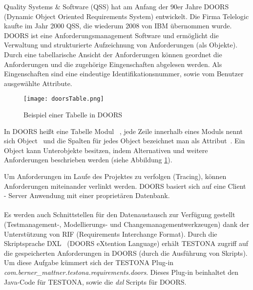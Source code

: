 
Quality Systems \& Software (QSS) hat am Anfang der 90er Jahre DOORS (Dynamic Object Oriented Requirements System) entwickelt. Die Firma Telelogic kaufte im Jahr 2000 QSS, die wiederum 2008 von IBM übernommen wurde. DOORS ist eine Anforderungsmanagement Software und ermöglicht die Verwaltung und strukturierte Aufzeichnung von Anforderungen (als Objekte). Durch eine tabellarische Ansicht der Anforderungen können geordnet die Anforderungen und die zugehörige Eingenschaften abgelesen werden. Als Eingenschaften sind eine eindeutige Identifikationsnummer, sowie vom Benutzer ausgewählte Attribute.\\


\begin{figure}[h]
  \begin{center}
    \texttt{[image: doorsTable.png]}
  		  \caption{Beispiel einer Tabelle in DOORS}
     \label{doors.bespiel}
  \end{center}
\end{figure}


In DOORS heißt eine Tabelle \glqq Modul\grqq~ , jede Zeile innerhalb eines Moduls nennt sich \glqq Object\grqq~ und die Spalten für jedes Object bezeichnet man als \glqq Attribut\grqq~. Ein Object kann Unterobjekte besitzen, indem Alternativen und weitere Anforderungen beschrieben werden (siehe Abbildung \ref{doors.bespiel}).

Um Anforderungen im Laufe des Projektes zu verfolgen (Tracing), können Anforderungen miteinander verlinkt werden. DOORS basiert sich auf eine Client - Server Anwendung mit einer proprietären Datenbank. \\
\\
Es werden auch Schnittstellen für den Datenaustausch zur Verfügung gestellt (Testmanagement-, Modellierungs- und Changemanagementwerkzeugen) dank der Unterstützung von RIF (Requirements Interchange Format). Durch die Skriptsprache \glqq DXL\grqq~ (DOORS eXtention Language) erhält TESTONA zugriff auf die gespeicherten Anforderungen in DOORS (durch die Ausführung von Skripts). \cite{Doors} \cite{Anforderungsmanagement}\\

Um diese Aufgabe kümmert sich der TESTONA Plug-in \textit{com.berner\_mattner.testona.requirements.doors}. Dieses Plug-in beinhaltet den Java-Code für TESTONA, sowie die \textit{dxl} Scripts für DOORS.


